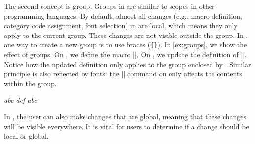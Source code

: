 \documentclass{ltugboat}
\begin{document}
The second concept is group.
Groups in \LT{} are similar to scopes in other programming languages.
By default, almost all changes (e.g., macro definition, category code assignment, font selection) in \LT{} are local, which means they only apply to the current group.
These changes are not visible outside the group.
In \LT{}, one way to create a new group is to use braces (\verb|{}|).
In \cref{ex:groups}, we show the effect of groups.
On , we define the macro \inltex|\abc|.
On , we update the definition of \inltex|\abc|.
Notice how the updated definition only applies to the group enclosed by .
Similar principle is also reflected by fonts: the \inltex|\normalfont| command on  only affects the contents within the group.
\begin{latexsample}[examplelabel={ex:groups},exampletitle={Groups}]
\itshape
\def\abc{abc }%
\abc%
{%
  \normalfont%
  \def\abc{def }%
  \abc%
}%
\abc%
\end{latexsample}
\noindent In \LT{}, the user can also make changes that are global, meaning that these changes will be visible everywhere.
It is vital for \LT{} users to determine if a change should be local or global.
\end{document}
